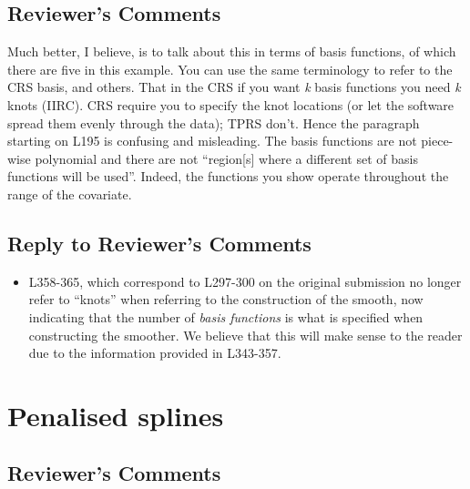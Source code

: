 \documentclass[
]{article}
\providecommand{\tightlist}{%
  \setlength{\itemsep}{0pt}\setlength{\parskip}{0pt}}
\begin{document}
\hypertarget{reviewers-comments-4}{%
\subsection{Reviewer's Comments}\label{reviewers-comments-4}}

Much better, I believe, is to talk about this in terms of basis functions, of which there are five in this example. You can use the same terminology to refer to the CRS basis, and others. That in the CRS if you want \emph{k} basis functions you need \emph{k} knots (IIRC). CRS require you to specify the knot locations (or let the software spread them evenly through the data); TPRS don't.
Hence the paragraph starting on L195 is confusing and misleading. The basis functions are not piece-wise polynomial and there are not ``region{[}s{]} where a different set of basis functions will be used''. Indeed, the functions you show
operate throughout the range of the covariate.

\hypertarget{section-5}{%
\subsection{\texorpdfstring{\textcolor{reviewersblue} {Reply to Reviewer's Comments}}{}}\label{section-5}}

\begin{itemize}
\tightlist
\item
  L358-365, which correspond to L297-300 on the original submission no longer refer to ``knots'' when referring to the construction of the smooth, now indicating that the number of \emph{basis functions} is what is specified when constructing the smoother. We believe that this will make sense to the reader due to the information provided in L343-357.
\end{itemize}

\hypertarget{penalised-splines}{%
\section{Penalised splines}\label{penalised-splines}}

\hypertarget{reviewers-comments-5}{%
\subsection{Reviewer's Comments}\label{reviewers-comments-5}}
\end{document}

